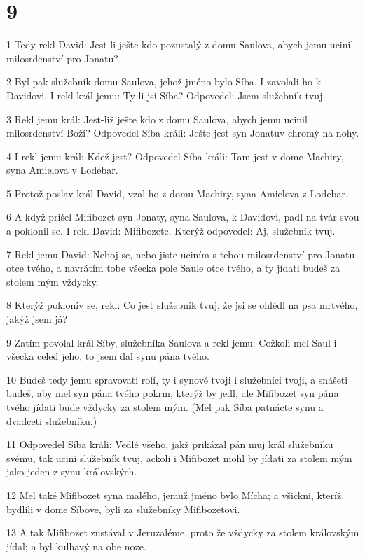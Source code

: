 \chapter{9}

\par 1 Tedy rekl David: Jest-li ješte kdo pozustalý z domu Saulova, abych jemu ucinil milosrdenství pro Jonatu?
\par 2 Byl pak služebník domu Saulova, jehož jméno bylo Síba. I zavolali ho k Davidovi. I rekl král jemu: Ty-li jsi Síba? Odpovedel: Jsem služebník tvuj.
\par 3 Rekl jemu král: Jest-liž ješte kdo z domu Saulova, abych jemu ucinil milosrdenství Boží? Odpovedel Síba králi: Ješte jest syn Jonatuv chromý na nohy.
\par 4 I rekl jemu král: Kdež jest? Odpovedel Síba králi: Tam jest v dome Machiry, syna Amielova v Lodebar.
\par 5 Protož poslav král David, vzal ho z domu Machiry, syna Amielova z Lodebar.
\par 6 A když prišel Mifibozet syn Jonaty, syna Saulova, k Davidovi, padl na tvár svou a poklonil se. I rekl David: Mifibozete. Kterýž odpovedel: Aj, služebník tvuj.
\par 7 Rekl jemu David: Neboj se, nebo jiste uciním s tebou milosrdenství pro Jonatu otce tvého, a navrátím tobe všecka pole Saule otce tvého, a ty jídati budeš za stolem mým vždycky.
\par 8 Kterýž pokloniv se, rekl: Co jest služebník tvuj, že jsi se ohlédl na psa mrtvého, jakýž jsem já?
\par 9 Zatím povolal král Síby, služebníka Saulova a rekl jemu: Cožkoli mel Saul i všecka celed jeho, to jsem dal synu pána tvého.
\par 10 Budeš tedy jemu spravovati rolí, ty i synové tvoji i služebníci tvoji, a snášeti budeš, aby mel syn pána tvého pokrm, kterýž by jedl, ale Mifibozet syn pána tvého jídati bude vždycky za stolem mým. (Mel pak Síba patnácte synu a dvadceti služebníku.)
\par 11 Odpovedel Síba králi: Vedlé všeho, jakž prikázal pán muj král služebníku svému, tak uciní služebník tvuj, ackoli i Mifibozet mohl by jídati za stolem mým jako jeden z synu královských.
\par 12 Mel také Mifibozet syna malého, jemuž jméno bylo Mícha; a všickni, kteríž bydlili v dome Síbove, byli za služebníky Mifibozetovi.
\par 13 A tak Mifibozet zustával v Jeruzaléme, proto že vždycky za stolem královským jídal; a byl kulhavý na obe noze.

